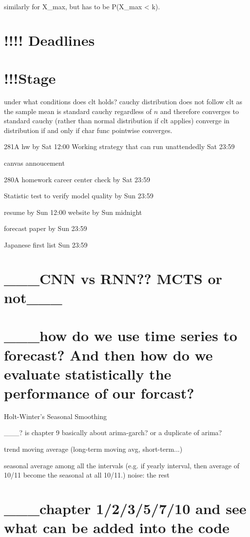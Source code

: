 {{{{{{{{{{similarly for X_max, but has to be P(X_max < k).



\section*{!!!! Deadlines}
\section*{!!!Stage}

under what conditions does clt holds?
cauchy distribution
	does not follow clt as the sample mean is standard cauchy regardless of $n$ and therefore converges to standard cauchy (rather than normal distribution if clt applies)
converge in distribution if and only if char func pointwise converges.


281A hw by Sat 12:00
Working strategy that can run unattendedly Sat 23:59


canvas annoucement

280A homework
career center check by Sat 23:59


Statistic test to verify model quality by Sun 23:59

resume by Sun 12:00
website by Sun midnight

forecast paper by Sun 23:59

Japanese first list Sun 23:59





\section*{___CNN vs RNN?? MCTS or not___}

\section*{___how do we use time series to forecast? And then how do we evaluate statistically the performance of our forcast?}

Holt-Winter's Seasonal Smoothing

___? is chapter 9 basically about arima-garch? or a duplicate of arima?

trend moving average (long-term moving avg, short-term...)


seasonal average among all the intervals (e.g. if yearly interval, then average of 10/11 become the seasonal at all 10/11.)
noise: the rest 

\section*{___chapter 1/2/3/5/7/10 and see what can be added into the code}

}}}}}}}}}}
